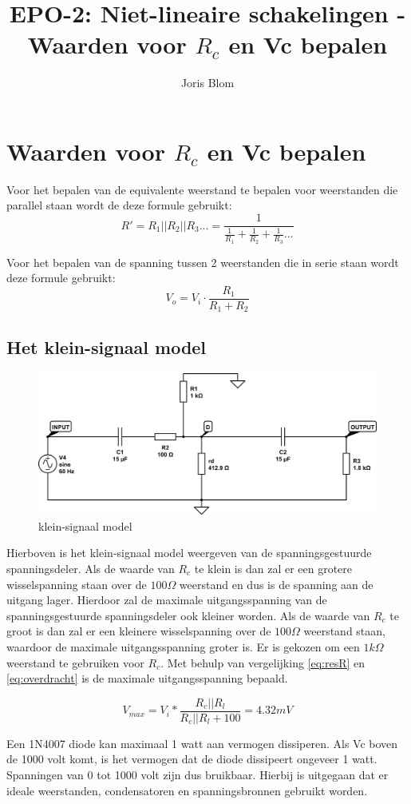 \documentclass{report}
\title{EPO-2: Niet-lineaire schakelingen - Waarden voor $R_c$ en Vc bepalen}
\author{Joris Blom}
\begin{document}
\chapter{Waarden voor $R_c$ en Vc bepalen}
\label{ch:Waarden voor $R_c$ en Vc bepalen}
Voor het bepalen van de equivalente weerstand te bepalen voor weerstanden die parallel staan wordt de deze formule gebruikt:
\begin{equation}
\label{eq:resR}
R' = R_1||R_2||R_3... = \frac{1}{\frac{1}{R_1}+\frac{1}{R_2}+\frac{1}{R_3}...}
\end{equation}

\noindent Voor het bepalen van de spanning tussen 2 weerstanden die in serie staan wordt deze formule gebruikt:
\begin{equation}
\label{eq:overdracht}
V_o =V_i\cdot \frac{R_1}{R_1+R_2}
\end{equation}

\section{Het klein-signaal model}
\label{ch:Het klein-signaal model}
\begin{figure}[h]
\centering
\includegraphics[width=\textwidth]{kleinsignaalmodel.png}

\caption{klein-signaal model}
\end{figure}
Hierboven is het klein-signaal model weergeven van de spanningsgestuurde spanningsdeler. Als de waarde van $R_c$ te klein is dan zal er een grotere wisselspanning staan over de $100\Omega$ weerstand en dus is de spanning aan de uitgang lager. Hierdoor zal de maximale uitgangsspanning van de spanningsgestuurde spanningsdeler ook kleiner worden. Als de waarde van $R_c$ te groot is dan zal er een kleinere wisselspanning over de $100\Omega$ weerstand staan, waardoor de maximale uitgangsspanning groter is. Er is gekozen om een $1k\Omega$ weerstand te gebruiken voor $R_c$. Met behulp van vergelijking \ref{eq:resR} en \ref{eq:overdracht} is de maximale uitgangsspanning bepaald.


$$
\label{eq:maximaalVoltage}
V_{max} = V_i * \frac{R_c||R_l}{R_c||R_l + 100} = 4.32 mV
$$

Een 1N4007 diode kan maximaal 1 watt aan vermogen dissiperen. Als Vc boven de 1000 volt komt, is het vermogen dat de diode dissipeert ongeveer 1 watt. Spanningen van 0 tot 1000 volt zijn dus bruikbaar. Hierbij is uitgegaan dat er ideale weerstanden, condensatoren en spanningsbronnen gebruikt worden.
\end{document}
